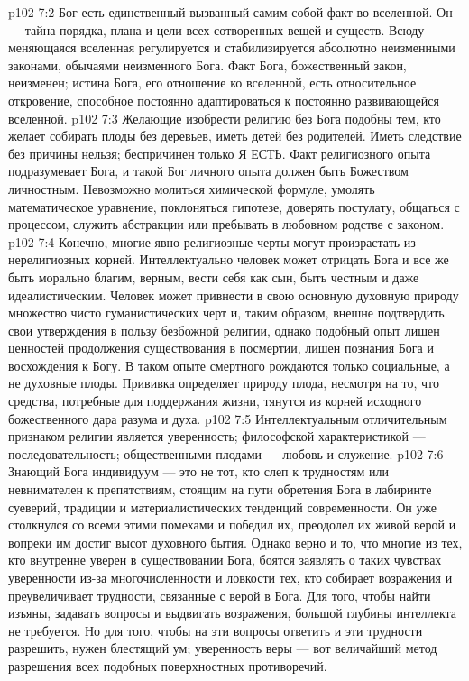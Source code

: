 \vs p102 7:2 Бог есть единственный вызванный самим собой факт во вселенной. Он --- тайна порядка, плана и цели всех сотворенных вещей и существ. Всюду меняющаяся вселенная регулируется и стабилизируется абсолютно неизменными законами, обычаями неизменного Бога. Факт Бога, божественный закон, неизменен; истина Бога, его отношение ко вселенной, есть относительное откровение, способное постоянно адаптироваться к постоянно развивающейся вселенной.
\vs p102 7:3 \pc Желающие изобрести религию без Бога подобны тем, кто желает собирать плоды без деревьев, иметь детей без родителей. Иметь следствие без причины нельзя; беспричинен только Я ЕСТЬ. Факт религиозного опыта подразумевает Бога, и такой Бог личного опыта должен быть Божеством личностным. Невозможно молиться химической формуле, умолять математическое уравнение, поклоняться гипотезе, доверять постулату, общаться с процессом, служить абстракции или пребывать в любовном родстве с законом.
\vs p102 7:4 Конечно, многие явно религиозные черты могут произрастать из нерелигиозных корней. Интеллектуально человек может отрицать Бога и все же быть морально благим, верным, вести себя как сын, быть честным и даже идеалистическим. Человек может привнести в свою основную духовную природу множество чисто гуманистических черт и, таким образом, внешне подтвердить свои утверждения в пользу безбожной религии, однако подобный опыт лишен ценностей продолжения существования в посмертии, лишен познания Бога и восхождения к Богу. В таком опыте смертного рождаются только социальные, а не духовные плоды. Прививка определяет природу плода, несмотря на то, что средства, потребные для поддержания жизни, тянутся из корней исходного божественного дара разума и духа.
\vs p102 7:5 Интеллектуальным отличительным признаком религии является уверенность; философской характеристикой --- последовательность; общественными плодами --- любовь и служение.
\vs p102 7:6 \pc Знающий Бога индивидуум --- это не тот, кто слеп к трудностям или невнимателен к препятствиям, стоящим на пути обретения Бога в лабиринте суеверий, традиции и материалистических тенденций современности. Он уже столкнулся со всеми этими помехами и победил их, преодолел их живой верой и вопреки им достиг высот духовного бытия. Однако верно и то, что многие из тех, кто внутренне уверен в существовании Бога, боятся заявлять о таких чувствах уверенности из\hyp{}за многочисленности и ловкости тех, кто собирает возражения и преувеличивает трудности, связанные с верой в Бога. Для того, чтобы найти изъяны, задавать вопросы и выдвигать возражения, большой глубины интеллекта не требуется. Но для того, чтобы на эти вопросы ответить и эти трудности разрешить, нужен блестящий ум; уверенность веры --- вот величайший метод разрешения всех подобных поверхностных противоречий.
